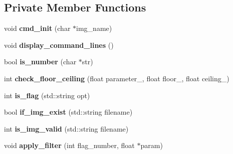 \subsection*{Private Member Functions}
\begin{DoxyCompactItemize}
\item 
void {\bfseries cmd\+\_\+init} (char $\ast$img\+\_\+name)\hypertarget{classimage__tools_1_1MIACmdApp_a278267a85ee24a43f9775a3aa3aa7974}{}\label{classimage__tools_1_1MIACmdApp_a278267a85ee24a43f9775a3aa3aa7974}

\item 
void {\bfseries display\+\_\+command\+\_\+lines} ()\hypertarget{classimage__tools_1_1MIACmdApp_a8705f454be7f96ff4dc751b7e7aa3e91}{}\label{classimage__tools_1_1MIACmdApp_a8705f454be7f96ff4dc751b7e7aa3e91}

\item 
bool {\bfseries is\+\_\+number} (char $\ast$str)\hypertarget{classimage__tools_1_1MIACmdApp_aeb761ff8f0d22139d805deb758510633}{}\label{classimage__tools_1_1MIACmdApp_aeb761ff8f0d22139d805deb758510633}

\item 
int {\bfseries check\+\_\+floor\+\_\+ceiling} (float parameter\+\_\+, float floor\+\_\+, float ceiling\+\_\+)\hypertarget{classimage__tools_1_1MIACmdApp_a757960fe6adf721f5fe90220fdedf6fc}{}\label{classimage__tools_1_1MIACmdApp_a757960fe6adf721f5fe90220fdedf6fc}

\item 
int {\bfseries is\+\_\+flag} (std\+::string opt)\hypertarget{classimage__tools_1_1MIACmdApp_a09dedce23bb09218241a712c1fd45588}{}\label{classimage__tools_1_1MIACmdApp_a09dedce23bb09218241a712c1fd45588}

\item 
bool {\bfseries if\+\_\+img\+\_\+exist} (std\+::string filename)\hypertarget{classimage__tools_1_1MIACmdApp_a0636ec4d010bc30a65121c18fee567a6}{}\label{classimage__tools_1_1MIACmdApp_a0636ec4d010bc30a65121c18fee567a6}

\item 
int {\bfseries is\+\_\+img\+\_\+valid} (std\+::string filename)\hypertarget{classimage__tools_1_1MIACmdApp_a6229c0ac9bb196b48b7c34a681523424}{}\label{classimage__tools_1_1MIACmdApp_a6229c0ac9bb196b48b7c34a681523424}

\item 
void {\bfseries apply\+\_\+filter} (int flag\+\_\+number, float $\ast$param)\hypertarget{classimage__tools_1_1MIACmdApp_ab46f6f07d8bda622fbfb609236495fdd}{}\label{classimage__tools_1_1MIACmdApp_ab46f6f07d8bda622fbfb609236495fdd}


\end{DoxyCompactItemize}
